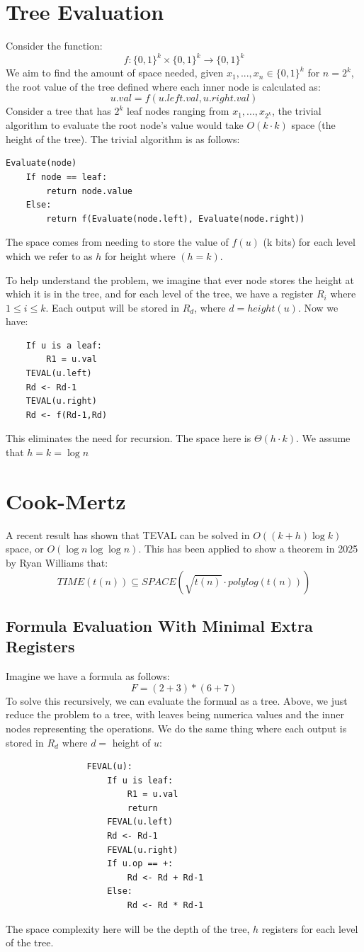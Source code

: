 \documentclass[11pt]{article}
\theoremstyle{definition}
\begin{document}
\section{Tree Evaluation}
Consider the function:
$$f: \{0,1\}^k \times \{0,1\}^k \rightarrow \{0,1\}^k$$
We aim to find the amount of space needed, given $x_1,...,x_n \in \{0,1\}^k$ for $n=2^k$, the root value of the tree defined where each inner node is calculated as:
$$u.val = f(u.left.val, u.right.val)$$
Consider a tree that has $2^k$ leaf nodes ranging from $x_1,...,x_{2^k}$, the trivial algorithm to evaluate the root node's value would take $O(k \cdot k)$ space (the height of the tree). The trivial algorithm is as follows:
\begin{verbatim}
Evaluate(node)
    If node == leaf:
        return node.value
    Else:
        return f(Evaluate(node.left), Evaluate(node.right))
\end{verbatim}
The space comes from needing to store the value of $f(u)$ (k bits) for each level which we refer to as $h$ for height where $(h = k)$.
\bigskip

To help understand the problem, we imagine that ever node stores the height at which it is in the tree, and for each level of the tree, we have a register $R_i$ where $1 \leq i \leq k$. Each output will be stored in $R_d$, where $d = height(u)$. Now we have:
\begin{verbatim}
    If u is a leaf:
        R1 = u.val
    TEVAL(u.left)
    Rd <- Rd-1
    TEVAL(u.right)
    Rd <- f(Rd-1,Rd)
\end{verbatim}
This eliminates the need for recursion. The space here is $\Theta(h\cdot k)$. We assume that $h = k = \log n$
\section{Cook-Mertz}
A recent result has shown that TEVAL can be solved in $O((k+h)\log k)$ space, or $O(\log n \log \log n)$. This has been applied to show a theorem in 2025 by Ryan Williams that:
$$TIME(t(n)) \subseteq SPACE(\sqrt{t(n)}\cdot polylog(t(n)))$$
\subsection{Formula Evaluation With Minimal Extra Registers}
Imagine we have a formula as follows:
$$F = (2+3) * (6 + 7)$$
To solve this recursively, we can evaluate the formual as a tree. Above, we just reduce the problem to a tree, with leaves being numerica values and the inner nodes representing the operations. We do the same thing where each output is stored in $R_d$ where $d = $ height of $u$:
\begin{verbatim}
                FEVAL(u):
                    If u is leaf:
                        R1 = u.val
                        return
                    FEVAL(u.left)
                    Rd <- Rd-1
                    FEVAL(u.right)
                    If u.op == +:
                        Rd <- Rd + Rd-1
                    Else:
                        Rd <- Rd * Rd-1
\end{verbatim}
The space complexity here will be the depth of the tree, $h$ registers for each level of the tree.
\bigskip
\end{document}
